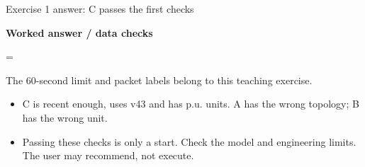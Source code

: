 \begin{frame}[t]{Exercise 1 answer: C passes the first checks}
\relax
{\scriptsize\color{Slate}\textbf{Worked answer / data checks}\par}\smallskip
\begingroup\begin{minipage}[c][3cm][c]{\linewidth}\centering{}=\hbox{\resizebox{.96\linewidth}{!}{}}\ifdim\dimexpr\ht0+\dp0\relax>3cm\resizebox{!}{3cm}{\box0}\else\box0\fi\par\end{minipage}
{\fontsize{7}{8.3}\selectfont\color{Slate} The 60-second limit and packet labels belong to this teaching exercise.\par}
\endgroup\smallskip
{
\small\begin{itemize}
\setlength{\itemsep}{.25em}
\item C is recent enough, uses v43 and has p.u. units. A has the wrong topology; B has the wrong unit.
\item Passing these checks is only a start. Check the model and engineering limits. The user may recommend, not execute.
\end{itemize}\par}
\vfill
{}
\end{frame}

